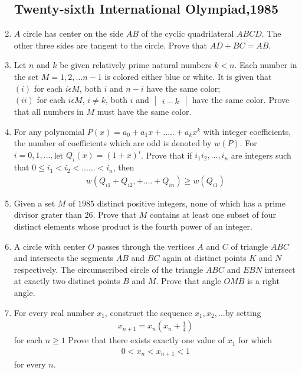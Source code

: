 \documentclass[12pt,-letter paper]{article}
\providecommand{\mydet}[1]{\ensuremath{\begin{vmatrix}#1\end{vmatrix}}}
\providecommand{\brak}[1]{\ensuremath{\left(#1\right)}}
\begin{document}
\begin{enumerate}
		\subsection*{Twenty-sixth International Olympiad,1985}
\item $A$ circle has center on the side $AB$ of the cyclic quadrilateral $ABCD$. The other three sides are tangent to the circle. Prove that $AD+BC = AB$.
\item Let  $n$ and $k$ be given relatively prime natural numbers $k<n$. Each number in the set $M={1,2,...n-1}$ is colored either blue or white. It is given that\\
	\brak{i} for each $i  \epsilon   M$, both $i$ and $n-i$ have the same color;\\
		\brak{ii} for each $i  \epsilon  M$, $i\neq k$, both $i$ and \mydet {i-k} have the same color. Prove that all numbers in $M$ must have the same color.
	\item For any polynomial $P\brak{x} = a_0 + a_1x + ..... + a_kx^k$ with integer coefficients,  the number of coefficients which are odd is denoted by $w\brak{P}$.  For $i = 0, 1, ..., $let $Q_i\brak{x} = \brak{1+x}^i$. Prove that if $i_1i_2, ..., i_n$ are integers such
		that $0\leq i_1<i_2<......<i_n$, then \begin{align*}  w(Q_{i1}+Q_{i2},+....+Q_{in})\geq w (Q_{i1}) \end{align*}

\item Given a set $M$ of $1985$ distinct positive integers, none of which has a prime divisor grater than $26$. Prove that $M$ contains at least one subset of four distinct elements whose product is the fourth power of an integer.
\item A circle with center $O$ passes through the vertices $A$ and $C$ of triangle $ABC$ and intersects the segments $AB$ and $BC$ again at distinct points $K$ and $N$ respectively. The circumscribed circle of the triangle $ABC$ and $EBN$ intersect at exactly two distinct points $B$ and $M$. Prove that angle $OMB$ is a right angle.






\item For every real number $x_1$, construct the sequence $x_1, x_2, ... $by setting
	\begin{align*} x_{n+1}=x_n\brak{x_n+\frac{1}{4}}\end{align*} for each $n \geq 1$
Prove that there exists exactly one value of $x_1$ for which
\begin{align*}
    0 < x_n<x_{n+1}<1
\end{align*}
for every $n$.





\end{enumerate}
\end{document}
